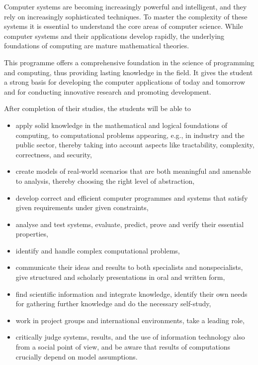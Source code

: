 
Computer systems are becoming increasingly powerful and intelligent,
and they rely on increasingly sophisticated techniques. To master the
complexity of these systems it is essential to understand the core
areas of computer science. While computer systems and their
applications develop rapidly, the underlying foundations of computing
are mature mathematical theories.

This programme offers a comprehensive foundation in the science of
programming and computing, thus providing lasting knowledge in the
field. It gives the student a strong basis for developing the computer
applications of today and tomorrow and for conducting innovative
research and promoting development.

After completion of their studies, the students will be able to
\begin{itemize}
\item apply solid knowledge in the mathematical and logical
  foundations of computing, to computational problems appearing, e.g.,
  in industry and the public sector, thereby taking into account
  aspects like tractability, complexity, correctness, and security,
\item create models of real-world scenarios that are both meaningful
  and amenable to analysis, thereby choosing the right level of
  abstraction,
\item develop correct and efficient computer programmes and systems
  that satisfy given requirements under given constraints,
\item analyse and test systems, evaluate, predict, prove and verify
  their essential properties,
\item identify and handle complex computational problems,
\item communicate their ideas and results to both specialists and
  nonspecialists, give structured and scholarly presentations in oral
  and written form,
\item find scientific information and integrate knowledge, identify
  their own needs for gathering further knowledge and do the necessary
  self-study,
\item work in project groups and international environments, take a
  leading role,
\item critically judge systems, results, and the use of information
  technology also from a social point of view, and be aware that
  results of computations crucially depend on model assumptions.
\end{itemize}
